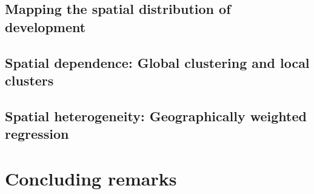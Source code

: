 \documentclass[a4paper,twoside]{article}
\begin{document}
\subsection{Mapping the spatial distribution of development}

\subsection{Spatial dependence: Global clustering and local clusters}

\subsection{Spatial heterogeneity: Geographically weighted regression}




\section{Concluding remarks}
\end{document}
